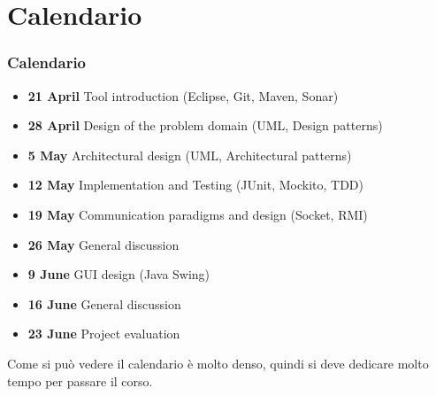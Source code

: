 \documentclass{beamer}
\begin{document}
\section{Calendario}
\begin{frame}
\frametitle{Calendario}
\begin{itemize}



\item  \textbf{21 April} Tool introduction (Eclipse, Git, Maven, Sonar)
\item  \textbf{28 April} Design of the problem domain (UML, Design patterns)
\item \textbf{5 May} Architectural design (UML, Architectural patterns)
\item \textbf{12 May} Implementation and Testing (JUnit, Mockito, TDD)
\item \textbf{19 May} Communication paradigms and design (Socket, RMI) 
\item \textbf{26 May} General discussion
\item \textbf{9 June} GUI design (Java Swing)
\item \textbf{16 June} General discussion
\item \textbf{23 June} Project evaluation

\end{itemize}

Come si pu\`o vedere il calendario \`e molto denso, quindi si deve dedicare molto tempo per passare il corso.
\end{frame}


\end{document}
